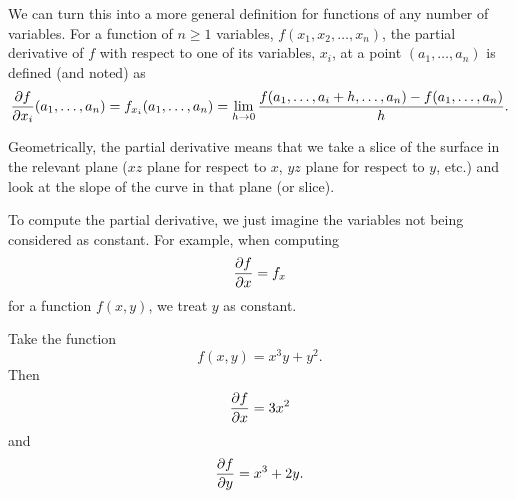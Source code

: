 We can turn this into a more general definition for functions of any number of variables.
\bdf
For a function of $n\ge 1$ variables, $f(x_1,x_2,\ldots,x_n)$, the partial derivative of $f$ with respect to one of its variables, $x_i$, at a point $(a_1,\ldots,a_n)$ is defined (and noted) as
\[ \frac{\partial f}{\partial x_i}(a_1,\ldots,a_n) = f_{x_i}(a_1,\ldots,a_n) = \lim_{h\to 0} \frac{f(a_1,\ldots,a_i+h,\ldots,a_n) - f (a_1,\ldots,a_n)}{h}. \]
\edf

Geometrically, the partial derivative means that we take a slice of the surface in the relevant plane ($xz$ plane for respect to $x$, $yz$ plane for respect to $y$, etc.) and look at the slope of the curve in that plane (or slice). 

To compute the partial derivative, we just imagine the variables not being considered as constant. For example, when computing 
\[ \frac{\partial f}{\partial x} = f_x\]
for a function $f(x,y)$, we treat $y$ as constant. 

\bex
Take the function
\[ f(x,y) = x^3y + y^2. \]
Then 
\[\frac{\partial f}{\partial x} =3x^2 \]
and 
\[\frac{\partial f}{\partial y}=x^3 + 2y. \]
\eex